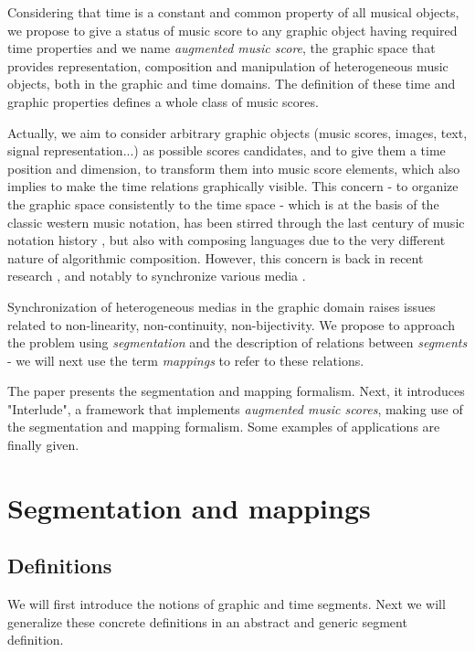 \documentclass[twoside,10pt]{article}
\begin{document}
Considering that time is a constant and common property of all musical objects, we propose to give a status of music score to any graphic object having required time properties and we name \emph{augmented music score}, the graphic space that provides representation, composition and manipulation of heterogeneous music objects, both in the graphic and time domains. 
The definition of these time and graphic properties defines a whole class of music scores.

Actually, we aim to consider arbitrary graphic objects (music scores, images, text, signal representation...) as possible scores candidates, and to give them a time position and dimension, to transform them into music score elements, which also implies to make the time relations graphically visible. This concern - to organize the graphic space consistently to the time space - which is at the basis of the classic western music notation, has been stirred through the last century of music notation history \cite{boucou}, but also with composing languages due to the very different nature of algorithmic composition. However, this concern is back in recent research \cite{bresson08}, and notably to synchronize various media \cite{baggi09}. 

Synchronization of heterogeneous medias in the graphic domain raises issues related to non-linearity, non-continuity, non-bijectivity. We propose to approach the problem using \emph{segmentation} and the description of relations between \emph{segments} - we will next use the term \emph{mappings} to refer to these relations.

The paper presents the segmentation and mapping formalism. Next, it introduces "Interlude", a framework that implements \emph{augmented music scores}, making use of the segmentation and mapping formalism. Some examples of applications are finally given.


\section{Segmentation and mappings}\label{sec:segmapping}

\subsection{Definitions}\label{subsec:definitions}

We will first introduce the notions of graphic and time segments. Next we will generalize these concrete definitions in an abstract and generic segment definition.
\end{document}
